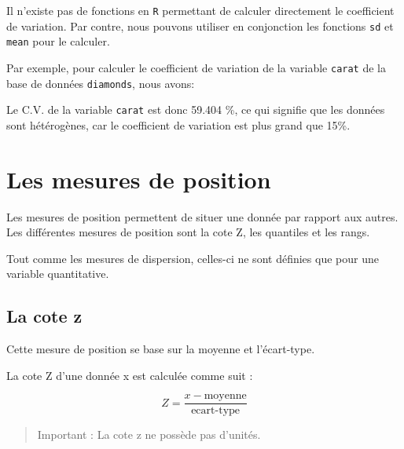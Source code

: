 \documentclass[]{book}
\newenvironment{Shaded}{\begin{snugshade}}{\end{snugshade}}
\newcommand{\DecValTok}[1]{\textcolor[rgb]{0.00,0.00,0.81}{#1}}
\newcommand{\KeywordTok}[1]{\textcolor[rgb]{0.13,0.29,0.53}{\textbf{#1}}}
\newcommand{\NormalTok}[1]{#1}
\newcommand{\OperatorTok}[1]{\textcolor[rgb]{0.81,0.36,0.00}{\textbf{#1}}}
\theoremstyle{definition}
\theoremstyle{definition}
\theoremstyle{definition}
\theoremstyle{remark}
\begin{document}
Il n'existe pas de fonctions en \texttt{R} permettant de calculer
directement le coefficient de variation. Par contre, nous pouvons
utiliser en conjonction les fonctions \texttt{sd} et \texttt{mean} pour
le calculer.

Par exemple, pour calculer le coefficient de variation de la variable
\texttt{carat} de la base de données \texttt{diamonds}, nous avons:

\begin{Shaded}
\end{Shaded}

Le C.V. de la variable \texttt{carat} est donc 59.404 \%, ce qui
signifie que les données sont hétérogènes, car le coefficient de
variation est plus grand que 15\%.

\hypertarget{les-mesures-de-position}{%
\section{Les mesures de position}\label{les-mesures-de-position}}

Les mesures de position permettent de situer une donnée par rapport aux
autres. Les différentes mesures de position sont la cote Z, les
quantiles et les rangs.

Tout comme les mesures de dispersion, celles-ci ne sont définies que
pour une variable quantitative.

\hypertarget{la-cote-z}{%
\subsection{La cote z}\label{la-cote-z}}

Cette mesure de position se base sur la moyenne et l'écart-type.

La cote Z d'une donnée x est calculée comme suit :

\begin{equation}
Z = \dfrac{x-\text{moyenne}}{\text{ecart-type}}
\end{equation}

\begin{quote}
Important : La cote z ne possède pas d'unités.
\end{quote}
\end{document}
